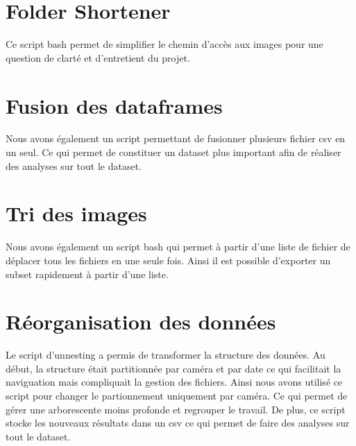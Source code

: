 \section{Folder Shortener}

Ce script bash permet de simplifier le chemin d'accès aux images pour une question de clarté et d'entretient du projet.

\section{Fusion des dataframes}

Nous avons également un script permettant de fusionner plusieurs fichier csv en un seul. Ce qui permet de constituer un dataset plus important afin de réaliser des analyses sur tout le dataset.

\section{Tri des images}

Nous avons également un script bash qui permet à partir d'une liste de fichier de déplacer tous les fichiers en une seule fois. Ainsi il est possible d'exporter un subset rapidement à partir d'une liste.

\section{Réorganisation des données}

Le script d'unnesting a permis de transformer la structure des données. Au début, la structure était partitionnée par caméra et par date ce qui facilitait la naviguation mais compliquait la gestion des fichiers. Ainsi nous avons utilisé ce script pour changer le partionnement uniquement par caméra. Ce qui permet de gérer une arborescente moins profonde et regrouper le travail. De plus, ce script stocke les nouveaux résultats dans un csv ce qui permet de faire des analyses sur tout le dataset.
